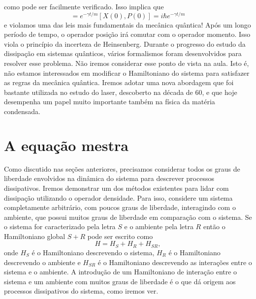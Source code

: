 \documentclass{article}
\begin{document}
como pode ser facilmente verificado. Isso implica que
\begin{equation}
    [X(t),P(t)] = e^{-\gamma t /m}[X(0),P(0)] = i\hbar e^{-\gamma t /m}
\end{equation}
e violamos uma das leis mais fundamentais da mecânica quântica! Após um longo período de tempo, o operador posição irá comutar com o operador momento. Isso viola o princípio da incerteza de Heinsenberg. Durante o progresso do estudo da dissipação em sistemas quânticos, vários formalismos foram desenvolvidos para resolver esse problema. Não iremos considerar esse ponto de vista na aula. Isto é, não estamos interessados em modificar o Hamiltoniano do sistema para satisfazer as regras da mecânica quântica. Iremos adotar uma nova abordagem que foi bastante utilizada no estudo do laser, descoberto na década de 60, e que hoje desempenha um papel muito importante também na física da matéria condensada.


\section{A equação mestra}

Como discutido nas seções anteriores, precisamos considerar todos os graus de liberdade envolvidos na dinâmica do sistema para descrever processos dissipativos. Iremos demonstrar um dos métodos existentes para lidar com dissipação utilizando o operador densidade. Para isso, considere um sistema completamente arbitrário, com poucos graus de liberdade, interagindo com o ambiente, que possui muitos graus de liberdade em comparação com o sistema. Se o sistema for caracterizado pela letra $S$ e o ambiente pela letra $R$ então o Hamiltoniano global $S+ R$ pode ser escrito como
\begin{equation}
    H = H_S + H_R + H_{SR},
    \label{hamiltoniano}
\end{equation}
onde $H_S$ é o Hamiltoniano descrevendo o sistema, $H_R$ é o Hamiltoniano descrevendo o ambiente e $H_{SR}$ é o Hamiltoniano descrevendo as interações entre o sistema e o ambiente. A introdução de um Hamiltoniano de interação entre o sistema e um ambiente com muitos graus de liberdade é o que dá origem aos processos dissipativos do sistema, como iremos ver. 
\end{document}
